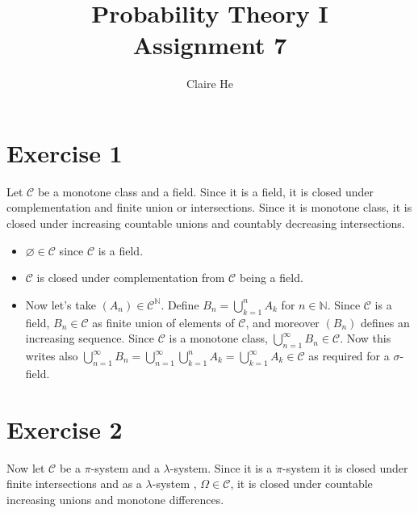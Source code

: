 \documentclass[english]{article}
\newcommand{\N}{\mathbb{N}}
\newcommand{\Cl}{\mathcal{C}}
\begin{document}
 
 
\title{Probability Theory I \\ 
Assignment 7}
\author{Claire He}
\maketitle





\section*{Exercise 1}

Let $\Cl$ be a monotone class and a field. Since it is a field, it is closed under complementation and finite union or intersections. Since it is monotone class, it is closed under increasing countable unions and countably decreasing intersections.

\begin{itemize}
    \item $\varnothing \in \Cl$ since $\Cl$ is a field. 
    \item $\Cl$ is closed under complementation from $\Cl$ being a field.
    \item Now let's take $(A_n) \in \Cl^\N$. Define $B_n = \bigcup_{k=1}^n A_k$ for  $n \in \N$. Since $\Cl$ is a field, $B_n \in \Cl$ as finite union of elements of $\Cl$, and moreover $(B_n)$ defines an increasing sequence. Since $\Cl$ is a monotone class, $\bigcup_{n =1}^{\infty} B_n \in \Cl$. Now this writes also  $\bigcup_{n =1}^{\infty} B_n = \bigcup_{n =1}^{\infty} \bigcup_{k=1}^n A_k = \bigcup_{k =1}^{\infty} A_k  \in \Cl$ as required for a $\sigma$-field. 
    
\end{itemize}



\section*{Exercise 2}

Now let $\Cl$ be a $\pi$-system and a $\lambda$-system. Since it is a  $\pi$-system it is closed under finite intersections and as a  $\lambda$-system , $\Omega \in \Cl$, it is closed under countable increasing unions and monotone differences.
\end{document}
